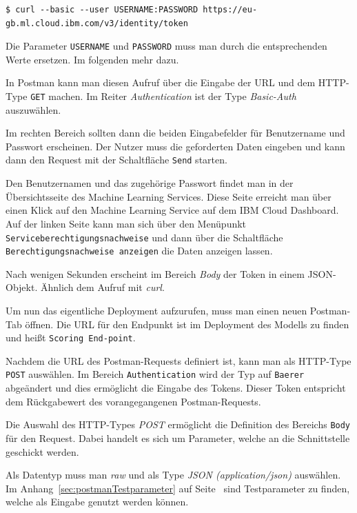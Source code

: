 \begin{lstlisting}[caption=Abruf des Auth-Tokens, label=ls:umsetzung_apitoken]
$ curl --basic --user USERNAME:PASSWORD https://eu-gb.ml.cloud.ibm.com/v3/identity/token
\end{lstlisting}

Die Parameter \texttt{USERNAME} und \texttt{PASSWORD} muss man durch die entsprechenden Werte ersetzen. Im folgenden
mehr dazu.

In Postman kann man diesen Aufruf über die Eingabe der URL und dem HTTP-Type \texttt{GET} machen. Im Reiter
\textit{Authentication} ist der Type \textit{Basic-Auth} auszuwählen.

Im rechten Bereich sollten dann die beiden Eingabefelder für Benutzername und Passwort erscheinen. Der Nutzer muss die
geforderten Daten eingeben und kann dann den Request mit der Schaltfläche \texttt{Send} starten.

Den Benutzernamen und das zugehörige Passwort findet man in der Übersichtsseite des Machine Learning Services. Diese
Seite erreicht man über einen Klick auf den Machine Learning Service auf dem IBM Cloud Dashboard. Auf der linken Seite
kann man sich über den Menüpunkt \texttt{Serviceberechtigungsnachweise} und dann über die Schaltfläche
\texttt{Berechtigungsnachweise anzeigen} die Daten anzeigen lassen.

Nach wenigen Sekunden erscheint im Bereich \textit{Body} der Token in einem JSON-Objekt. Ähnlich dem Aufruf mit
\textit{curl}.

Um nun das eigentliche Deployment aufzurufen, muss man einen neuen Postman-Tab öffnen. Die URL für den Endpunkt ist im
Deployment des Modells zu finden und heißt \texttt{Scoring End-point}.

Nachdem die URL des Postman-Requests definiert ist, kann man als HTTP-Type \texttt{POST} auswählen. Im Bereich
\texttt{Authentication} wird der Typ auf \texttt{Baerer} abgeändert und dies ermöglicht die Eingabe des Tokens. Dieser
Token entspricht dem Rückgabewert des vorangegangenen Postman-Requests.

Die Auswahl des HTTP-Types \textit{POST} ermöglicht die Definition des Bereichs \texttt{Body} für den Request. Dabei
handelt es sich um Parameter, welche an die Schnittstelle geschickt werden.

Als Datentyp muss man \textit{raw} und als Type \textit{JSON (application/json)} auswählen. Im
Anhang~\ref{sec:postmanTestparameter} auf Seite~\pageref{sec:postmanTestparameter} sind Testparameter zu finden, welche
als Eingabe genutzt werden können.

